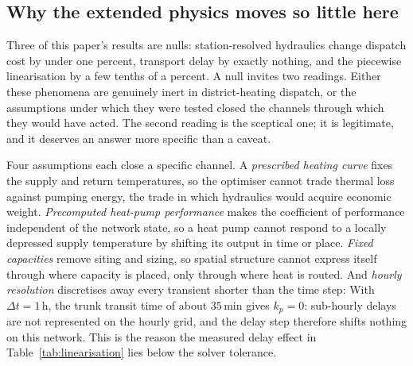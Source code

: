 
\subsection{Why the extended physics moves so little here}
\label{subsec:whynull}

Three of this paper's results are nulls: station-resolved hydraulics change dispatch cost
by under one percent, transport delay by exactly nothing, and the piecewise linearisation
by a few tenths of a percent. A null invites two readings. Either these phenomena are
genuinely inert in district-heating dispatch, or the assumptions under which they were tested
closed the channels through which they would have acted. The second reading is the
sceptical one; it is legitimate, and it deserves an answer more specific than a caveat.

Four assumptions each close a specific channel. A \emph{prescribed heating curve} fixes the
supply and return temperatures, so the optimiser cannot trade thermal loss against pumping
energy, the trade in which hydraulics would acquire economic weight. \emph{Precomputed
heat-pump performance} makes the coefficient of performance independent of the network
state, so a heat pump cannot respond to a locally depressed supply temperature by shifting
its output in time or place. \emph{Fixed capacities} remove siting and sizing, so spatial
structure cannot express itself through where capacity is placed, only through where heat
is routed. And \emph{hourly resolution} discretises away every transient shorter than the
time step: With $\Delta t = 1$\,h, the trunk transit time of about $35$\,min gives $k_p = 0$: sub-hourly
delays are not represented on the hourly grid, and the delay step therefore shifts nothing on
this network. This is the reason the measured delay effect in
Table~\ref{tab:linearisation} lies below the solver tolerance.

